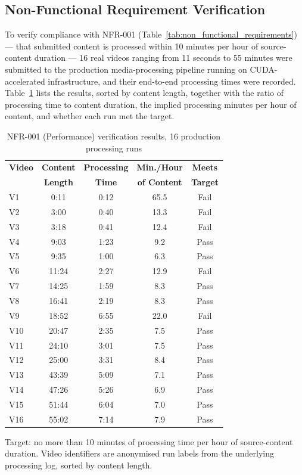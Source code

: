 \documentclass[oneside]{utmthesis}
\begin{document}
\subsection{Non-Functional Requirement Verification}\label{sec:nfr_verification}
To verify compliance with NFR-001 (Table~\ref{tab:non_functional_requirements}) --- that submitted content is processed within 10 minutes per hour of source-content duration --- 16 real videos ranging from 11 seconds to 55 minutes were submitted to the production media-processing pipeline running on CUDA-accelerated infrastructure, and their end-to-end processing times were recorded. Table~\ref{tab:nfr_performance} lists the results, sorted by content length, together with the ratio of processing time to content duration, the implied processing minutes per hour of content, and whether each run met the target.

\begin{table}[H]
    \centering
    \footnotesize
    \caption{NFR-001 (Performance) verification results, 16 production processing runs}\label{tab:nfr_performance}
    \begin{tabular}{lcccc}
        \toprule
        \textbf{Video} & \textbf{Content} & \textbf{Processing} & \textbf{Min./Hour} & \textbf{Meets} \\
        & \textbf{Length} & \textbf{Time} & \textbf{of Content} & \textbf{Target} \\
        \midrule
        V1  & 0:11  & 0:12 & 65.5 & Fail \\
        V2  & 3:00  & 0:40 & 13.3 & Fail \\
        V3  & 3:18  & 0:41 & 12.4 & Fail \\
        V4  & 9:03  & 1:23 & 9.2  & Pass \\
        V5  & 9:35  & 1:00 & 6.3  & Pass \\
        V6  & 11:24 & 2:27 & 12.9 & Fail \\
        V7  & 14:25 & 1:59 & 8.3  & Pass \\
        V8  & 16:41 & 2:19 & 8.3  & Pass \\
        V9  & 18:52 & 6:55 & 22.0 & Fail \\
        V10 & 20:47 & 2:35 & 7.5  & Pass \\
        V11 & 24:10 & 3:01 & 7.5  & Pass \\
        V12 & 25:00 & 3:31 & 8.4  & Pass \\
        V13 & 43:39 & 5:09 & 7.1  & Pass \\
        V14 & 47:26 & 5:26 & 6.9  & Pass \\
        V15 & 51:44 & 6:04 & 7.0  & Pass \\
        V16 & 55:02 & 7:14 & 7.9  & Pass \\
        \bottomrule
    \end{tabular}
    \begin{flushleft}
        \small Target: no more than 10 minutes of processing time per hour of source-content duration. Video identifiers are anonymised run labels from the underlying processing log, sorted by content length.
    \end{flushleft}
\end{table}
\end{document}
